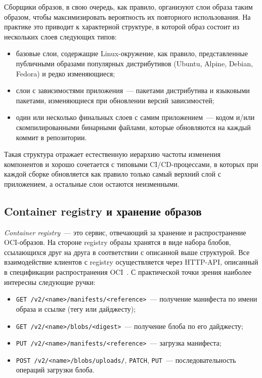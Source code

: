 Сборщики образов, в свою очередь, как правило, организуют слои образа таким образом, чтобы максимизировать вероятность их повторного использования. На практике это приводит к характерной структуре, в которой образ состоит из нескольких слоев следующих типов:

\begin{itemize}
\item базовые слои, содержащие Linux-окружение, как правило, представленные публичными образами популярных дистрибутивов (Ubuntu, Alpine, Debian, Fedora) и редко изменяющиеся;
\item слои с зависимостями приложения~--- пакетами дистрибутива и языковыми пакетами, изменяющиеся при обновлении версий зависимостей;
\item один или несколько финальных слоев с самим приложением~--- кодом и/или скомпилированными бинарными файлами, которые обновляются на каждый коммит в репозитории.
\end{itemize}

Такая структура отражает естественную иерархию частоты изменения компонентов и хорошо сочетается с типовыми CI/CD-процессами, в которых при каждой сборке обновляется как правило только самый верхний слой с приложением, а остальные слои остаются неизменными.

\subsection{Container registry и хранение образов}

\textit{Container registry}~--- это сервис, отвечающий за хранение и распространение OCI-образов. На стороне registry образы хранятся в виде набора блобов, ссылающихся друг на друга в соответствии с описанной выше структурой. Все взаимодействие клиентов с registry осуществляется через HTTP-API, описанный в спецификации распространения OCI~\cite{oci}. С практической точки зрения наиболее интересны следующие ручки:

\begin{itemize}
\item \texttt{GET /v2/<name>/manifests/<reference>}~--- получение манифеста по имени образа и ссылке (тегу или дайджесту);
\item \texttt{GET /v2/<name>/blobs/<digest>}~--- получение блоба по его дайджесту;
\item \texttt{PUT /v2/<name>/manifests/<reference>}~--- загрузка манифеста;
\item \texttt{POST /v2/<name>/blobs/uploads/}, \texttt{PATCH}, \texttt{PUT}~--- последовательность операций загрузки блоба.
\end{itemize}

